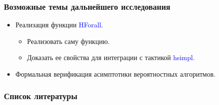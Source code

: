 \documentclass{beamer}
\begin{document}
\begin{frame}
	\frametitle{Возможные темы дальнейшего исследования}
	\begin{itemize}
		\item<2-> Реализация функции \textcolor{blue}{HForall}.
		      \begin{itemize}
			      \item<3-> Реализовать саму функцию.
			      \item<4-> Доказать ее свойства для интеграции с тактикой \textcolor{blue}{hsimpl}.
		      \end{itemize}
		\item<5-> Формальная верификация асимптотики вероятностных алгоритмов.
	\end{itemize}
\end{frame}

\begin{frame}[allowframebreaks]
	\frametitle{Список литературы}
	\printbibliography
\end{frame}

\end{document}
